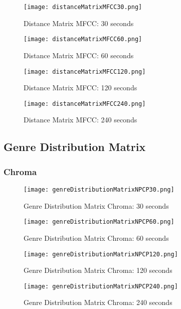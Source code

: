 \documentclass{article} %
\begin{document}
\begin{figure}[H]
\centering
\texttt{[image: distanceMatrixMFCC30.png]}
\caption{Distance Matrix MFCC: 30 seconds}
\end{figure}

\begin{figure}[H]
\centering
\texttt{[image: distanceMatrixMFCC60.png]}
\caption{Distance Matrix MFCC: 60 seconds}
\end{figure}

\begin{figure}[H]
\centering
\texttt{[image: distanceMatrixMFCC120.png]}
\caption{Distance Matrix MFCC: 120 seconds}
\end{figure}

\begin{figure}[H]
\centering
\texttt{[image: distanceMatrixMFCC240.png]}
\caption{Distance Matrix MFCC: 240 seconds}
\end{figure}


\clearpage
\subsection{Genre Distribution Matrix}
\subsubsection{Chroma}
\label{sec:gdcA}

\begin{figure}[H]
\centering
\texttt{[image: genreDistributionMatrixNPCP30.png]}
\caption{Genre Distribution Matrix Chroma: 30 seconds}
\end{figure}

\begin{figure}[H]
\centering
\texttt{[image: genreDistributionMatrixNPCP60.png]}
\caption{Genre Distribution Matrix Chroma: 60 seconds}
\end{figure}

\begin{figure}[H]
\centering
\texttt{[image: genreDistributionMatrixNPCP120.png]}
\caption{Genre Distribution Matrix Chroma: 120 seconds}
\end{figure}

\begin{figure}[H]
\centering
\texttt{[image: genreDistributionMatrixNPCP240.png]}
\caption{Genre Distribution Matrix Chroma: 240 seconds}
\end{figure}
\end{document}
